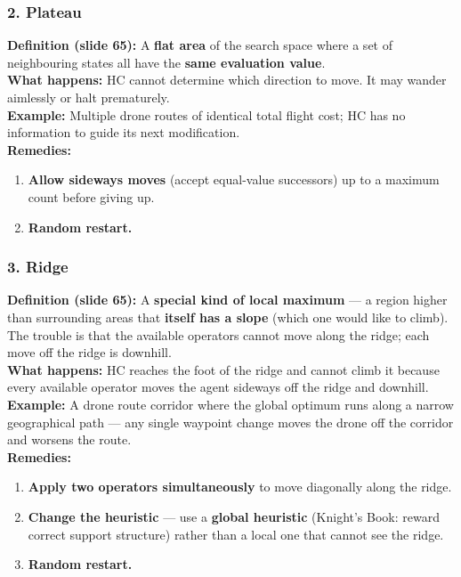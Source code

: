 \documentclass[12pt, a4paper]{article}
\begin{document}
\subsubsection*{2. Plateau}

\noindent\textbf{Definition (slide 65):} A \textbf{flat area} of the search space where a set of neighbouring states all have the \textbf{same evaluation value}.\\[0.2em]
\textbf{What happens:} HC cannot determine which direction to move. It may wander aimlessly or halt prematurely.\\[0.2em]
\textbf{Example:} Multiple drone routes of identical total flight cost; HC has no information to guide its next modification.\\[0.2em]
\textbf{Remedies:}
\begin{enumerate}[noitemsep]
  \item \textbf{Allow sideways moves} (accept equal-value successors) up to a maximum count before giving up.
  \item \textbf{Random restart.}
\end{enumerate}

\subsubsection*{3. Ridge}

\noindent\textbf{Definition (slide 65):} A \textbf{special kind of local maximum} — a region higher than surrounding areas that \textbf{itself has a slope} (which one would like to climb). The trouble is that the available operators cannot move along the ridge; each move off the ridge is downhill.\\[0.2em]
\textbf{What happens:} HC reaches the foot of the ridge and cannot climb it because every available operator moves the agent sideways off the ridge and downhill.\\[0.2em]
\textbf{Example:} A drone route corridor where the global optimum runs along a narrow geographical path — any single waypoint change moves the drone off the corridor and worsens the route.\\[0.2em]
\textbf{Remedies:}
\begin{enumerate}[noitemsep]
  \item \textbf{Apply two operators simultaneously} to move diagonally along the ridge.
  \item \textbf{Change the heuristic} — use a \textbf{global heuristic} (Knight's Book: reward correct support structure) rather than a local one that cannot see the ridge.
  \item \textbf{Random restart.}
\end{enumerate}
\end{document}
